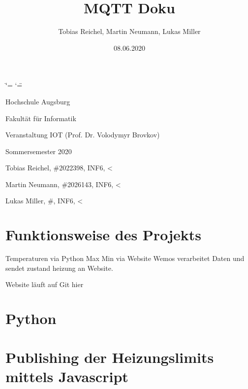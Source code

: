 \documentclass[a4paper,11pt,openany,oneside,ngerman]{sphinxmanual}
\title{MQTT Doku}
\date{08.06.2020}
\author{Tobias Reichel, Martin Neumann, Lukas Miller}
\begin{document}
\ifdefined\shorthandoff
  \ifnum\catcode`\=\string=\active\shorthandoff{=}\fi
  \ifnum\catcode`\"=\active{}\fi
\fi

\pagestyle{empty}
\sphinxmaketitle
\pagestyle{plain}
\sphinxtableofcontents
\pagestyle{normal}
\label{\detokenize{index::doc}}


\begin{DUlineblock}{0em}
\item[] Hochschule Augsburg
\item[] Fakultät für Informatik
\item[] Veranstaltung IOT (Prof. Dr. Volodymyr Brovkov)
\item[] Sommersemester 2020
\end{DUlineblock}


\begin{DUlineblock}{0em}
\item[] Tobias Reichel, \#2022398, INF6, \textless{}
\item[] Martin Neumann, \#2026143, INF6, \textless{}
\item[] Lukas Miller, \#, INF6, \textless{}
\end{DUlineblock}


\chapter{Funktionsweise des Projekts}
\label{\detokenize{einleitung:funktionsweise-des-projekts}}\label{\detokenize{einleitung::doc}}
Temperaturen via Python
Max Min via Website
Wemos verarbeitet Daten und sendet zustand heizung an Website.

Website läuft auf 
Git hier 


\chapter{Python}
\label{\detokenize{python:python}}\label{\detokenize{python::doc}}

\chapter{Publishing der Heizungslimits mittels Javascript}
\label{\detokenize{webpage:publishing-der-heizungslimits-mittels-javascript}}\label{\detokenize{webpage::doc}}
\end{document}
